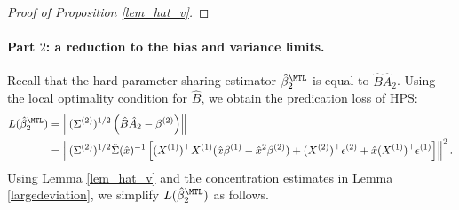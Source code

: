 \documentclass[aos,preprint]{imsart}
\begin{document}
\begin{proof}[Proof of Proposition \ref{lem_hat_v}]
%
\end{proof}

\iffalse
\paragraph{Part $2$: a reduction to the bias and variance limits.}
Recall that the hard parameter sharing estimator $\hat{\beta}_2^{\MTL}$ is equal to $\hat{B} \hat{A}_2$.
Using the local optimality condition for $\hat{B}$, we obtain the predication loss of HPS:
\begin{align}
L(\hat{\beta}_2^{\MTL}) &=\left\|(\Sigma^{(2)})^{1/2} \left( \hat B \hat A_2 - \beta^{(2)}\right)\right\| \nonumber\\
&=  \left\| (\Sigma^{(2)})^{1/2}\hat \Sigma(\hat x)^{-1} \left[(X^{(1)})^\top X^{(1)} (\hat x\beta^{(1)}-\hat x^2\beta^{(2)})+ (X^{(2)})^\top \epsilon^{(2)} + \hat x   (X^{(1)})^\top \epsilon^{(1)} \right]\right\|^2. %
\end{align}
Using Lemma \ref{lem_hat_v} and the concentration estimates in Lemma \ref{largedeviation}, we simplify $L(\hat{\beta}_2^{\MTL})$ as follows.
\end{document}
